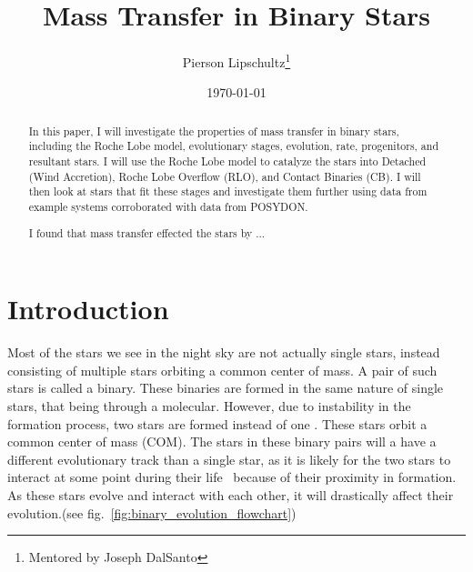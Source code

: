\documentclass[12pt, a4paper]{article}
\title{Mass Transfer in Binary Stars}
\author{Pierson Lipschultz\thanks{Mentored by Joseph DalSanto}}
\date{\today}
\begin{document}
\maketitle
\begin{abstract}
    \normalsize
    In this paper, I will investigate the properties of mass transfer in binary stars, including the Roche Lobe model, evolutionary stages, evolution, rate, progenitors, and resultant stars. I will use the Roche Lobe model to catalyze the stars into Detached (Wind Accretion), Roche Lobe Overflow (RLO), and Contact Binaries (CB). I will then look at stars that fit these stages and investigate them further using data from example systems corroborated with data from POSYDON.

    I found that mass transfer effected the stars by ... 
\end{abstract}

\section{\centering Introduction} %

    Most of the stars we see in the night sky are not actually single stars, instead consisting of multiple stars orbiting a common center of mass. A pair of such stars is called a binary. These binaries are formed in the same nature of single stars, that being through a molecular. However, due to instability in the formation process, two stars are formed instead of one \parencite{Offner_2016}. These stars orbit a common center of mass (COM). The stars in these binary pairs will a have a different evolutionary track than a single star, as it is likely for the two stars to interact at some point during their life~\parencite{Fabry_2025} because of their proximity in formation. As these stars evolve and interact with each other, it will drastically affect their evolution.(see fig.~\ref{fig:binary_evolution_flowchart})
\end{document}

